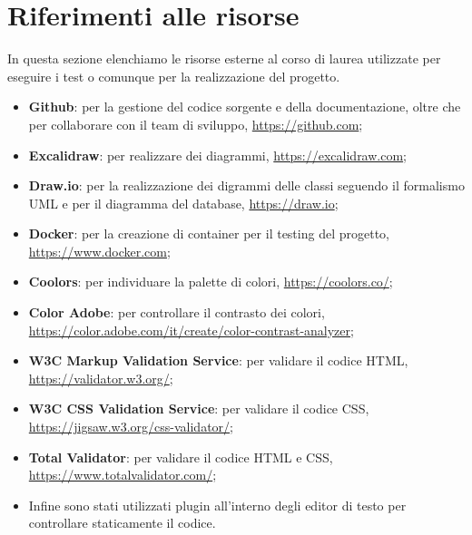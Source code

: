 \section{Riferimenti alle risorse}

In questa sezione elenchiamo le risorse esterne al corso di laurea utilizzate
per eseguire i test o comunque per la realizzazione del progetto.

\begin{itemize}
	\item \textbf{Github}: per la gestione del codice sorgente e della
	      documentazione, oltre che per collaborare con il team di sviluppo,
	      \url{https://github.com};

	\item \textbf{Excalidraw}: per realizzare dei diagrammi,
	      \url{https://excalidraw.com};

	\item \textbf{Draw.io}: per la realizzazione dei digrammi delle classi
	      seguendo il formalismo UML e per il diagramma del database,
	      \url{https://draw.io};

	\item \textbf{Docker}: per la creazione di container per il testing del
	      progetto, \url{https://www.docker.com};

	\item \textbf{Coolors}: per individuare la palette di colori,
	      \url{https://coolors.co/};

	\item \textbf{Color Adobe}: per controllare il contrasto dei colori,
	      \url{https://color.adobe.com/it/create/color-contrast-analyzer};

	\item \textbf{W3C Markup Validation Service}: per validare il codice
	      HTML, \url{https://validator.w3.org/};

	\item \textbf{W3C CSS Validation Service}: per validare il codice CSS,
	      \url{https://jigsaw.w3.org/css-validator/};

	\item \textbf{Total Validator}: per validare il codice HTML e CSS,
	      \url{https://www.totalvalidator.com/};

	\item Infine sono stati utilizzati plugin all'interno degli editor di
	      testo per controllare staticamente il codice.
\end{itemize}
